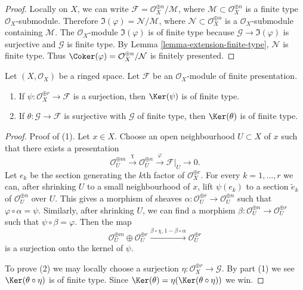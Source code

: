 \begin{proof}
Locally on $X$, we can write
$\mathcal{F} = \mathcal{O}_X^{\oplus n} / \mathcal{M}$, where
$\mathcal{M} \subset \mathcal{O}_X^{\oplus n}$ is a finite type
$\mathcal{O}_X$-submodule. Therefore
$\Im(\varphi) = \mathcal{N} / \mathcal{M}$, where
$\mathcal{N} \subset \mathcal{O}_X^{\oplus n}$ is a
$\mathcal{O}_X$-submodule containing $\mathcal{M}$.
The $\mathcal{O}_X$-module $\Im(\varphi)$ is of finite type
because $\mathcal{G} \to \Im(\varphi)$ is surjective and
$\mathcal{G}$ is finite type. By Lemma \ref{lemma-extension-finite-type},
$\mathcal{N}$ is finite type. Thus
$\Coker(\varphi) = \mathcal{O}_X^{\oplus n} / \mathcal{N}$
is finitely presented.
\end{proof}

\begin{lemma}
\label{lemma-kernel-surjection-finite-free-onto-finite-presentation}
Let $(X, \mathcal{O}_X)$ be a ringed space.
Let $\mathcal{F}$ be an $\mathcal{O}_X$-module of finite presentation.
\begin{enumerate}
\item If $\psi : \mathcal{O}_X^{\oplus r} \to \mathcal{F}$ is a surjection,
then $\Ker(\psi)$ is of finite type.
\item If $\theta : \mathcal{G} \to \mathcal{F}$ is surjective with
$\mathcal{G}$ of finite type, then $\Ker(\theta)$ is of finite type.
\end{enumerate}
\end{lemma}

\begin{proof}
Proof of (1).
Let $x \in X$. Choose an open neighbourhood $U \subset X$ of $x$
such that there exists a presentation
$$
\mathcal{O}_U^{\oplus m}
\xrightarrow{\chi}
\mathcal{O}_U^{\oplus n}
\xrightarrow{\varphi}
\mathcal{F}|_U
\to
0.
$$
Let $e_k$ be the section generating the $k$th factor of
$\mathcal{O}_X^{\oplus r}$. For every $k = 1, \ldots, r$
we can, after shrinking $U$ to a small neighbourhood of $x$,
lift $\psi(e_k)$ to a section $\tilde e_k$ of
$\mathcal{O}_U^{\oplus n}$ over $U$. This gives a morphism
of sheaves $\alpha : \mathcal{O}_U^{\oplus r} \to \mathcal{O}_U^{\oplus n}$
such that $\varphi \circ \alpha = \psi$.
Similarly, after shrinking $U$, we can find a morphism
$\beta : \mathcal{O}_U^{\oplus n} \to \mathcal{O}_U^{\oplus r}$
such that $\psi \circ \beta = \varphi$. Then the map
$$
\mathcal{O}_U^{\oplus m} \oplus
\mathcal{O}_U^{\oplus r}
\xrightarrow{\beta \circ \chi, 1 - \beta \circ \alpha}
\mathcal{O}_U^{\oplus r}
$$
is a surjection onto the kernel of $\psi$.

\medskip\noindent
To prove (2) we may locally choose a surjection
$\eta : \mathcal{O}_X^{\oplus r} \to \mathcal{G}$.
By part (1) we see $\Ker(\theta \circ \eta)$ is of finite type.
Since $\Ker(\theta) = \eta(\Ker(\theta \circ \eta))$ we win.
\end{proof}

